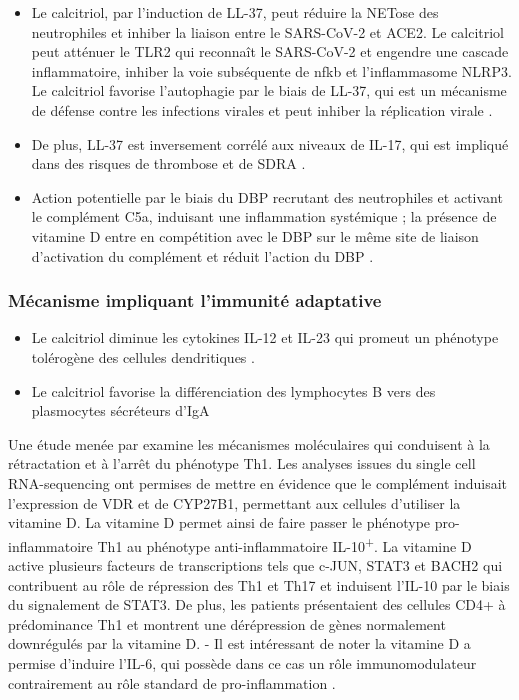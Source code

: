 \documentclass[
  a4paper,
  DIV=11,
  numbers=noendperiod,
  listof=totoc]{scrreprt}
\providecommand{\tightlist}{%
  \setlength{\itemsep}{0pt}\setlength{\parskip}{0pt}}\usepackage{longtable,booktabs,array}
\begin{document}
\begin{itemize}
\item
  Le calcitriol, par l'induction de LL-37, peut réduire la NETose des
  neutrophiles et inhiber la liaison entre le SARS-CoV-2 et ACE2. Le
  calcitriol peut atténuer le TLR2 qui reconnaît le SARS-CoV-2 et
  engendre une cascade inflammatoire, inhiber la voie subséquente de
  \ac{nfkb} et l'inflammasome NLRP3. Le calcitriol favorise l'autophagie
  par le biais de LL-37, qui est un mécanisme de défense contre les
  infections virales et peut inhiber la réplication virale
  \autocite{Gotelli.2022}.
\item
  De plus, LL-37 est inversement corrélé aux niveaux de IL-17, qui est
  impliqué dans des risques de thrombose et de \ac{SDRA}
  \autocite{Pal.2022}.
\item
  Action potentielle par le biais du DBP recrutant des neutrophiles et
  activant le complément C5a, induisant une inflammation systémique ; la
  présence de vitamine D entre en compétition avec le DBP sur le même
  site de liaison d'activation du complément et réduit l'action du DBP
  \autocite{Speeckaert.2020,Contreras-Bolívar.2023}.
\end{itemize}

\subsubsection{Mécanisme impliquant l'immunité
adaptative}\label{muxe9canisme-impliquant-limmunituxe9-adaptative}

\begin{itemize}
\tightlist
\item
  Le calcitriol diminue les cytokines IL-12 et IL-23 qui promeut un
  phénotype tolérogène des cellules dendritiques
  \autocite{Gotelli.2022}.
\item
  Le calcitriol favorise la différenciation des lymphocytes B vers des
  plasmocytes sécréteurs d'IgA \autocites[ ]{Gotelli.2022}{Chauss.2022}
\end{itemize}

Une étude menée par \textcite{Chauss.2022} examine les mécanismes
moléculaires qui conduisent à la rétractation et à l'arrêt du phénotype
\ac{Th1}. Les analyses issues du single cell RNA-sequencing ont permises
de mettre en évidence que le complément induisait l'expression de
\ac{VDR} et de \ac{CYP27B1}, permettant aux cellules d'utiliser la
vitamine D. La vitamine D permet ainsi de faire passer le phénotype
pro-inflammatoire \ac{Th1} au phénotype anti-inflammatoire
IL-10\textsuperscript{+}. La vitamine D active plusieurs facteurs de
transcriptions tels que c-JUN, STAT3 et BACH2 qui contribuent au rôle de
répression des \ac{Th1} et Th17 et induisent l'IL-10 par le biais du
signalement de STAT3. De plus, les patients présentaient des cellules
CD4+ à prédominance \ac{Th1} et montrent une dérépression de gènes
normalement downrégulés par la vitamine D. - Il est intéressant de noter
la vitamine D a permise d'induire l'IL-6, qui possède dans ce cas un
rôle immunomodulateur contrairement au rôle standard de pro-inflammation
\autocite{Chauss.2022}.
\end{document}
